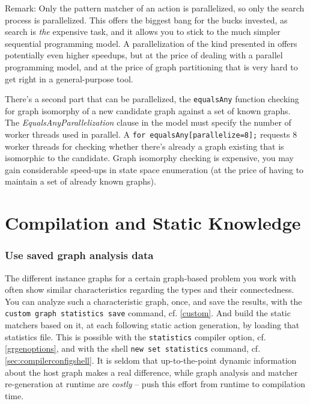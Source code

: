 Remark: Only the pattern matcher of an action is parallelized, so only the search process is parallelized.
This offers the biggest bang for the bucks invested, as search is \emph{the} expensive task, and it allows you to stick to the much simpler sequential programming model.
A parallelization of the kind presented in \cite{ParGraErs} offers potentially even higher speedups, but at the price of dealing with a parallel programming model, and at the price of graph partitioning that is very hard to get right in a general-purpose tool.

There's a second part that can be parallelized, the \texttt{equalsAny} function checking for graph isomorphy of a new candidate graph against a set of known graphs.
The \emph{EqualsAnyParallelization} clause in the model must specify the number of worker threads used in parallel.
A \verb#for equalsAny[parallelize=8];# requests 8 worker threads for checking whether there's already a graph existing that is isomorphic to the candidate.
Graph isomorphy checking is expensive, you may gain considerable speed-ups in state space enumeration (at the price of having to maintain a set of already known graphs).

\section{Compilation and Static Knowledge}

\subsubsection*{Use saved graph analysis data}
The different instance graphs for a certain graph-based problem you work with often show similar characteristics regarding the types and their connectedness.
You can analyze such a characteristic graph, once, and save the results,
with the \texttt{custom graph statistics save} command, cf. \ref{custom}.
And build the static matchers based on it, at each following static action generation, by loading that statistics file. 
This is possible with the \texttt{statistics} compiler option, cf. \ref{grgenoptions},
and with the shell \texttt{new set statistics} command, cf. \ref{sec:compilerconfigshell}. 
It is seldom that up-to-the-point dynamic information about the host graph makes a real difference,
while graph analysis and matcher re-generation at runtime are \emph{costly} -- push this effort from runtime to compilation time.


